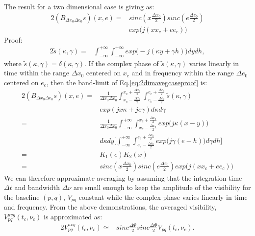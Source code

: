 The result for a two dimensional case is giving as:
\begin{alignat}{2}
(B_{\Delta x_0 \Delta e_0}s)(x,e)=&sinc (x\frac{\Delta x_0}{2})sinc(e\frac{\Delta e_0}{2})\\
				  &exp\big(j (xx_c+ee_c)\big)\label{eq:2dimavegcase}
\end{alignat}
Proof:
\begin{alignat}{2}
\tilde{s}(\kappa,\gamma) =& \int_{-\infty}^{+\infty}\int_{-\infty}^{+\infty}exp\big(-j(\kappa y+\gamma h)\big)dydh, 
\label{eq:2dimavegcaseproof}
\end{alignat}
where $\tilde{s}(\kappa,\gamma)=\delta(\kappa,\gamma)$. If the complex phase of  $\tilde{s}(\kappa,\gamma)$ varies linearly in time within 
the range $\Delta x_0$ centered on  $x_c$ and in frequency within the range
$\Delta e_0$ centered on $e_c$, then the band-limit of Eq.\ref{eq:2dimavegcaseproof} is:
\begin{alignat*}{2}
(B_{\Delta x_0\Delta e_0}s)(x,e) =& \frac{1}{\Delta x_0\Delta e_0}\int_{x_c-\frac{\Delta x_0}{2}}^{x_c+\frac{\Delta 
x_0}{2}}\int_{e_c-\frac{\Delta e_0}{2}}^{e_c+\frac{\Delta e_0}{2}}\tilde{s}(\kappa,\gamma)\\
				  &exp(jx\kappa+je\gamma)d\kappa d\gamma\\
		     =& \frac{1}{\Delta x_0 \Delta e_0}\int_{-\infty}^{+\infty}\int_{x_c-\frac{\Delta x_0}{2}}^{x_c+\frac{\Delta 
x_0}{2}}exp\big(j\kappa(x-y)\big)\\
		      &d\kappa dy \bigg[\int_{-\infty}^{+\infty}\int_{e_c-\frac{\Delta e_0}{2}}^{e_c+\frac{\Delta 
e_0}{2}}exp\big(j\gamma(e-h)\big)d\gamma dh\bigg]\\
		     =&K_1(e)K_2(x)\\
		     =&sinc (x\frac{\Delta x_0}{2})sinc(e\frac{\Delta e_0}{2})exp\big(j (xx_c+ee_c)\big)
\end{alignat*}
We can therefore approximate averaging   by assuming that the integration time $\Delta t$ and bandwidth $\Delta \nu$ are
small enough to keep the  amplitude of the visibility for the baseline $(p,q)$, $V_{pq}$  constant while
the complex phase varies linearly in time and frequency. From the above demonstrations, the averaged visibility, $V_{pq}^{avg}(t_c, 
\nu_c)$ is approximated as:
\begin{alignat}{2}
 V_{pq}^{avg}(t_c, \nu_c)\simeq& sinc\frac{\Delta \Psi}{2}sinc\frac{\Delta \Phi}{2} V_{pq}(t_{c},\nu_{c})\label{eq:visibility}.
\end{alignat}
